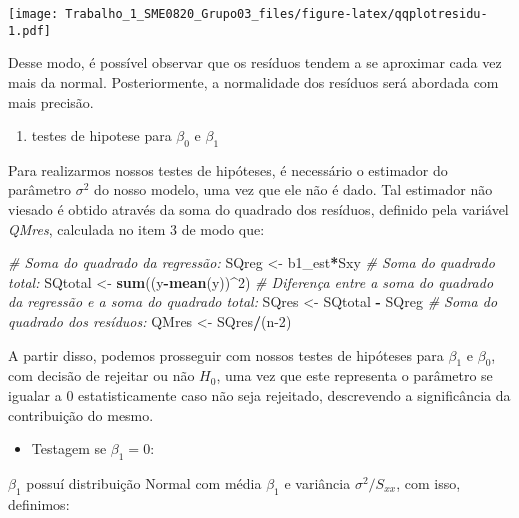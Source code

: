 \documentclass[
]{article}
\newenvironment{Shaded}{\begin{snugshade}}{\end{snugshade}}
\newcommand{\CommentTok}[1]{\textcolor[rgb]{0.56,0.35,0.01}{\textit{#1}}}
\newcommand{\DecValTok}[1]{\textcolor[rgb]{0.00,0.00,0.81}{#1}}
\newcommand{\KeywordTok}[1]{\textcolor[rgb]{0.13,0.29,0.53}{\textbf{#1}}}
\newcommand{\NormalTok}[1]{#1}
\newcommand{\OperatorTok}[1]{\textcolor[rgb]{0.81,0.36,0.00}{\textbf{#1}}}
\newcommand{\StringTok}[1]{\textcolor[rgb]{0.31,0.60,0.02}{#1}}
\providecommand{\tightlist}{%
  \setlength{\itemsep}{0pt}\setlength{\parskip}{0pt}}
\begin{document}
\texttt{[image: Trabalho\_1\_SME0820\_Grupo03\_files/figure-latex/qqplotresidu-1.pdf]}

Desse modo, é possível observar que os resíduos tendem a se aproximar
cada vez mais da normal. Posteriormente, a normalidade dos resíduos será
abordada com mais precisão.

\begin{enumerate}
\def\labelenumi{\arabic{enumi}.}
\setcounter{enumi}{3}
\tightlist
\item
  testes de hipotese para \(\beta_0\) e \(\beta_1\)
\end{enumerate}

Para realizarmos nossos testes de hipóteses, é necessário o estimador do
parâmetro \(\sigma^2\) do nosso modelo, uma vez que ele não é dado. Tal
estimador não viesado é obtido através da soma do quadrado dos resíduos,
definido pela variável \emph{QMres}, calculada no item 3 de modo que:

\begin{Shaded}
\begin{Highlighting}[]
\CommentTok{# Soma do quadrado da regressão:}
\NormalTok{SQreg <-}\StringTok{ }\NormalTok{b1_est}\OperatorTok{*}\NormalTok{Sxy}
\CommentTok{# Soma do quadrado total:}
\NormalTok{SQtotal <-}\StringTok{ }\KeywordTok{sum}\NormalTok{((y}\OperatorTok{-}\KeywordTok{mean}\NormalTok{(y))}\OperatorTok{^}\DecValTok{2}\NormalTok{)}
\CommentTok{# Diferença entre a soma do quadrado da regressão e a soma do quadrado total:}
\NormalTok{SQres <-}\StringTok{ }\NormalTok{SQtotal }\OperatorTok{-}\StringTok{ }\NormalTok{SQreg}
\CommentTok{# Soma do quadrado dos resíduos:}
\NormalTok{QMres <-}\StringTok{ }\NormalTok{SQres}\OperatorTok{/}\NormalTok{(n}\DecValTok{-2}\NormalTok{)}
\end{Highlighting}
\end{Shaded}

A partir disso, podemos prosseguir com nossos testes de hipóteses para
\(\beta_1\) e \(\beta_0\), com decisão de rejeitar ou não \(H_0\), uma
vez que este representa o parâmetro se igualar a 0 estatisticamente caso
não seja rejeitado, descrevendo a significância da contribuição do
mesmo.

\begin{itemize}
\tightlist
\item
  Testagem se \(\beta_1 = 0\):
\end{itemize}

\(\beta_1\) possuí distribuição Normal com média \(\beta_1\) e variância
\(\sigma^2/S_{xx}\), com isso, definimos:
\end{document}
